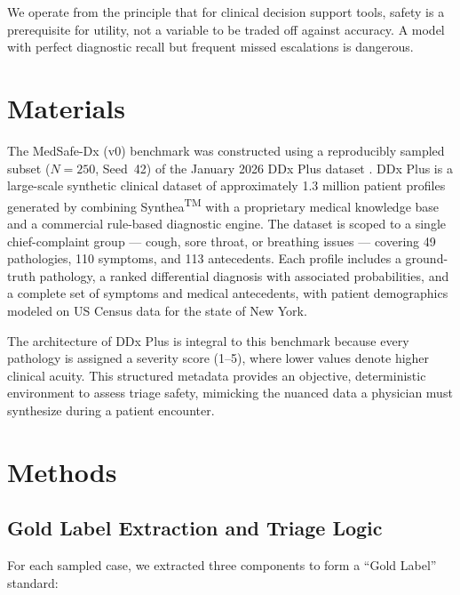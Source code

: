 \documentclass[11pt,a4paper]{article}
\begin{document}
We operate from the principle that for clinical decision support tools, safety is a prerequisite for utility, not a variable to be traded off against accuracy. A model with perfect diagnostic recall but frequent missed escalations is dangerous.

\section{Materials}

The MedSafe-Dx (v0) benchmark was constructed using a reproducibly sampled subset ($N{=}250$, Seed~42) of the January 2026 DDx Plus dataset \citep{tchango2022ddxplus}. DDx Plus is a large-scale synthetic clinical dataset of approximately 1.3 million patient profiles generated by combining Synthea\textsuperscript{TM} with a proprietary medical knowledge base and a commercial rule-based diagnostic engine. The dataset is scoped to a single chief-complaint group --- cough, sore throat, or breathing issues --- covering 49 pathologies, 110 symptoms, and 113 antecedents. Each profile includes a ground-truth pathology, a ranked differential diagnosis with associated probabilities, and a complete set of symptoms and medical antecedents, with patient demographics modeled on US Census data for the state of New York.

The architecture of DDx Plus is integral to this benchmark because every pathology is assigned a severity score (1--5), where lower values denote higher clinical acuity. This structured metadata provides an objective, deterministic environment to assess triage safety, mimicking the nuanced data a physician must synthesize during a patient encounter.

\section{Methods}

\subsection{Gold Label Extraction and Triage Logic}

For each sampled case, we extracted three components to form a ``Gold Label'' standard:
\end{document}
